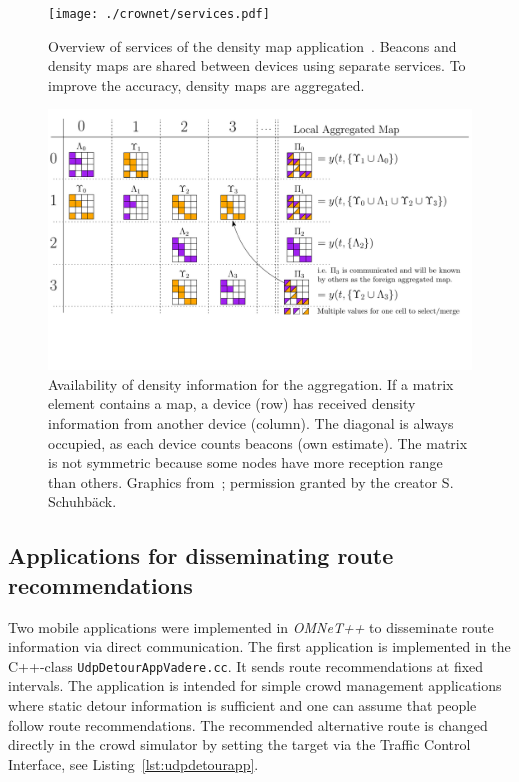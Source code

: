 \begin{figure}[hbt!]
\texttt{[image: ./crownet/services.pdf]} 
\caption[Estimating the pedestrian density map: apps and services]{Overview of services of the density map application~\cite{schuhbaeck-2023-com}. Beacons and density maps are shared between devices using separate services. To improve the accuracy, density maps are aggregated.}
\label{fig:services-crowdsensoring}
\end{figure}

\begin{figure}
\includegraphics[width=\textwidth]{../figures/crownet/map_matrix.pdf} 
\caption{Availability of density information for the aggregation. If a matrix element contains a map, a device (row) has received density information from another device (column). The diagonal is always occupied, as each device counts beacons (own estimate). The matrix is not symmetric because some nodes have more reception range than others. Graphics from~\cite{schuhbaeck-2023-com}; permission granted by the creator S. Schuhbäck.}
\label{fig:aggregation}
\end{figure}


 

\subsection{Applications for disseminating route recommendations}

Two mobile applications were implemented in \textit{OMNeT++} to disseminate route information via direct communication. The first application is implemented in the C++-class \lstinline{UdpDetourAppVadere.cc}. It sends route recommendations at fixed intervals. The application is intended for simple crowd management applications where static detour information is sufficient and one can assume that people follow route recommendations. The recommended alternative route is changed directly in the crowd simulator by setting the target via the Traffic Control Interface, see Listing~\ref{lst:udpdetourapp}.


